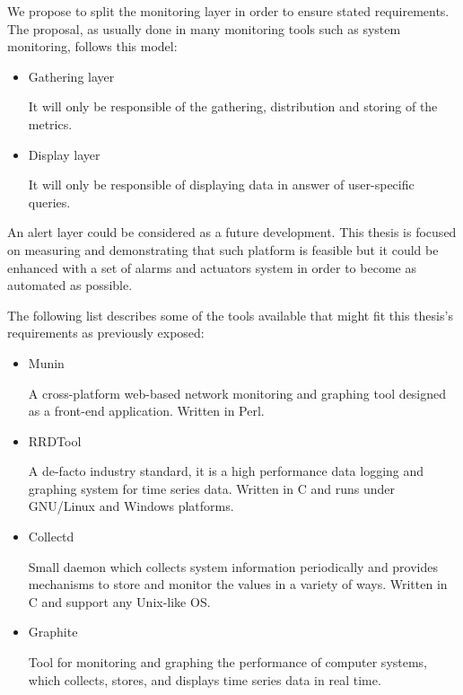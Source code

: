 We propose to split the monitoring layer in order to ensure stated requirements. The proposal, as usually done in many monitoring tools such as system monitoring, follows this model:
\begin{itemize}
\item Gathering layer \hfill

It will only be responsible of the gathering, distribution and storing of the metrics.

\item Display layer

It will only be responsible of displaying data in answer of user-specific queries.

\end{itemize}
An alert layer could be considered as a future development. This thesis is focused on measuring and demonstrating that such platform is feasible but it could be enhanced with a set of alarms and actuators system in order to become as automated as possible.

The following list describes some of the tools available that might fit this thesis's requirements as previously exposed:

\begin{itemize}
\item Munin \cite{munin}\hfill

A cross-platform web-based network monitoring and graphing tool designed as a front-end application. Written in Perl.

\item RRDTool \cite{rrdtool}\hfill

A de-facto industry standard, it is a high performance data logging and graphing system for time series data. Written in C and runs under GNU/Linux and Windows platforms.

\item Collectd \cite{collectd}\hfill

Small daemon which collects system information periodically and provides mechanisms to store and monitor the values in a variety of ways. Written in C and support any Unix-like OS.

\item Graphite \cite{graphite}\hfill

Tool for monitoring and graphing the performance of computer systems, which collects, stores, and displays time series data in real time.

\end{itemize}

